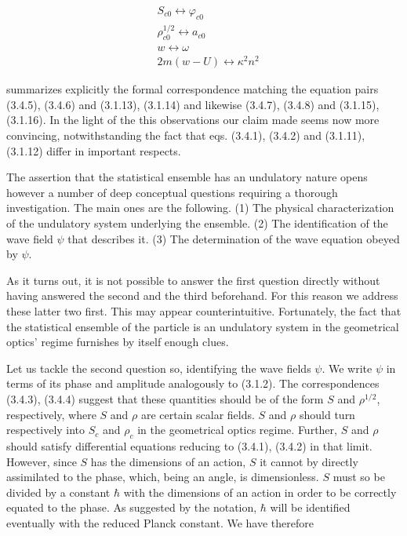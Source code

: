 \documentclass{article}
\begin{document}
\begin{align*}
& S_{c 0} \longleftrightarrow \varphi_{c 0}  \tag{3.4.9}\\
& \rho_{c 0}^{1 / 2} \longleftrightarrow a_{c 0}  \tag{3.4.10}\\
& w \longleftrightarrow \omega  \tag{3.4.11}\\
& 2 m(w-U) \longleftrightarrow \kappa^{2} n^{2} \tag{3.4.12}
\end{align*}
 
summarizes explicitly the formal correspondence matching the equation pairs (3.4.5), (3.4.6) and (3.1.13), (3.1.14) and likewise (3.4.7), (3.4.8) and (3.1.15), (3.1.16). In the light of the this observations our claim made seems now more convincing, notwithstanding the fact that eqs. (3.4.1), (3.4.2) and (3.1.11), (3.1.12) differ in important respects.

The assertion that the statistical ensemble has an undulatory nature opens however a number of deep conceptual questions requiring a thorough investigation. The main ones are the following.
(1) The physical characterization of the undulatory system underlying the ensemble.
(2) The identification of the wave field $\psi$ that describes it.
(3) The determination of the wave equation obeyed by $\psi$.

As it turns out, it is not possible to answer the first question directly without having answered the second and the third beforehand. For this reason we address these latter two first. This may appear counterintuitive. Fortunately, the fact that the statistical ensemble of the particle is an undulatory system in the geometrical optics' regime furnishes by itself enough clues.

Let us tackle the second question so, identifying the wave fields $\psi$. We write $\psi$ in terms of its phase and amplitude analogously to (3.1.2). The correspondences (3.4.3), (3.4.4) suggest that these quantities should be of the form $S$ and $\rho^{1 / 2}$, respectively, where $S$ and $\rho$ are certain scalar fields. $S$ and $\rho$ should turn respectively into $S_{c}$ and $\rho_{c}$ in the geometrical optics regime. Further, $S$ and $\rho$ should satisfy differential equations reducing to (3.4.1), (3.4.2) in that limit. However, since $S$ has the dimensions of an action, $S$ it cannot by directly assimilated to the phase, which, being an angle, is dimensionless. $S$ must so be divided by a constant $\hbar$ with the dimensions of an action in order to be correctly equated to the phase. As suggested by the notation, $\hbar$ will be identified eventually with the reduced Planck constant. We have therefore
 
\end{document}
